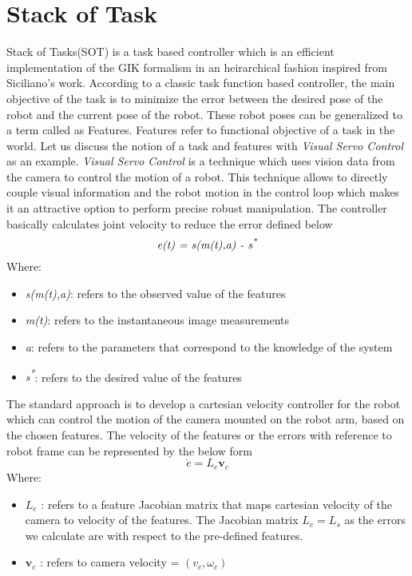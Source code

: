 \section{Stack of Task}
Stack of Tasks(SOT) is a task based controller which is an efficient implementation of the GIK formalism in an heirarchical fashion inspired from Siciliano's work.  According to a classic task function based controller, the main objective of the task is to minimize the error between the desired pose of the robot and the current pose of the robot. These robot poses can be generalized to a term called as Features. Features refer to functional objective of a task in the world. Let us discuss the notion of a task and features with \textit{Visual Servo Control} as an example. \textit{Visual Servo Control} is a technique which uses vision data from the camera to control the motion of a robot. This technique allows to directly couple visual information and the robot motion in the control loop which makes it an attractive option to perform precise robust manipulation. The controller basically calculates joint velocity to reduce the error defined below \cite{Hutchinson2006}
\[\textit{e(t) = s(m(t),a) - s\textsuperscript{*}}\]
Where:
\begin{itemize}[label=]
    \item \textit{s(m(t),a)}: refers to the observed value of the features
    \item \textit{m(t)}:      refers to the instantaneous image measurements
    \item \textit{a}:         refers to the parameters that correspond to the knowledge of the system
    \item  \textit{s\textsuperscript{*}}:       refers to the desired value of the features
\end{itemize}
The standard approach is to develop a cartesian velocity controller for the robot which can control the motion of the camera mounted on the robot arm, based on the chosen features\cite{Hutchinson2006}. The velocity of the features or the errors with reference to robot frame can be represented by the below form
\[\dot{e} = L_{e}\mathbf{v}_{c}\] 
Where:
\begin{itemize}[label=]
    \item \textit{ $L_{e}$ }: refers to a feature Jacobian matrix that maps cartesian velocity of the camera to velocity of the features. The Jacobian matrix $L_{e} = L_{s}$ as the errors we calculate are with respect to the pre-defined features.
    \item \textit{ $\mathbf{v}_{c}$ }: refers to camera velocity = $({v}_{c},{\omega}_{c})$ 
\end{itemize}
